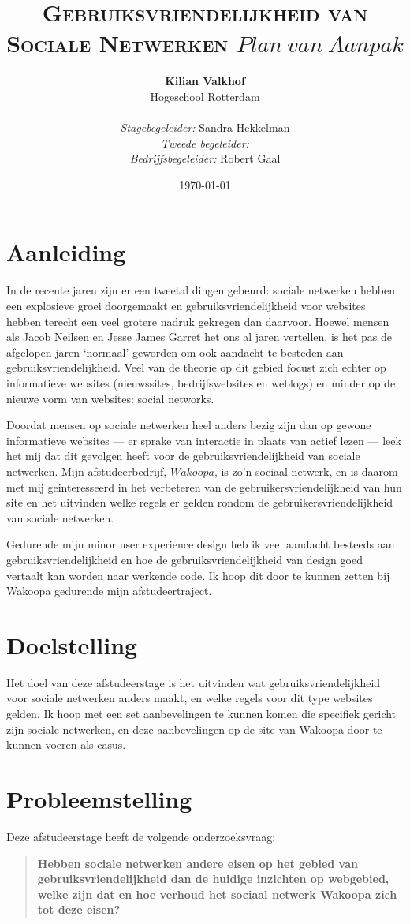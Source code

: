 \documentclass[a4paper, 10pt, pdftex]{article}
\title{\textsc{Gebruiksvriendelijkheid van Sociale Netwerken} \linebreak $Plan~van~Aanpak$}
\author{\textbf{Kilian Valkhof}\\
  Hogeschool Rotterdam\\
  \\
  \textit{Stagebegeleider:} Sandra Hekkelman\\
  \textit{Tweede begeleider:}\\
  \textit{Bedrijfsbegeleider:} Robert Gaal}
\date{\today}
\begin{document}
  \normalem
  \maketitle

  \newpage
  \tableofcontents

  \newpage
\section{Aanleiding}
In de recente jaren zijn er een tweetal dingen gebeurd: sociale netwerken hebben een explosieve groei doorgemaakt
en gebruiksvriendelijkheid voor websites hebben terecht een veel grotere nadruk gekregen dan daarvoor. Hoewel mensen
als Jacob Neilsen en Jesse James Garret het ons al jaren vertellen, is het pas de afgelopen jaren `normaal' geworden
om ook aandacht te besteden aan gebruiksvriendelijkheid. Veel van de theorie op dit gebied focust zich echter op
informatieve websites (nieuwssites, bedrijfswebsites en weblogs) en minder op de nieuwe vorm van websites: social networks.

Doordat mensen op sociale netwerken heel anders bezig zijn dan op gewone informatieve websites --- er sprake van interactie in plaats van actief lezen ---
leek het mij dat dit gevolgen heeft voor de gebruiksvriendelijkheid
van sociale netwerken. Mijn afstudeerbedrijf, $Wakoopa$, is zo'n sociaal netwerk, en is daarom met mij geinteresseerd in het verbeteren
van de gebruikersvriendelijkheid van hun site en het uitvinden welke regels er gelden rondom de gebruikersvriendelijkheid van sociale netwerken.

Gedurende mijn minor user experience design heb ik veel aandacht besteeds aan gebruiksvriendelijkheid en hoe de gebruiksvriendelijkheid van design
goed vertaalt kan worden naar werkende code. Ik hoop dit door te kunnen zetten bij Wakoopa gedurende mijn afstudeertraject.

\section{Doelstelling}
Het doel van deze afstudeerstage is het uitvinden wat gebruiksvriendelijkheid voor sociale netwerken anders maakt, en welke regels voor dit type websites gelden.
Ik hoop met een set aanbevelingen te kunnen komen die specifiek gericht zijn sociale netwerken, en deze aanbevelingen op de site van Wakoopa door te kunnen voeren als casus.


\section{Probleemstelling}
Deze afstudeerstage heeft de volgende onderzoeksvraag:
\begin{quotation}
 \textbf{Hebben sociale netwerken andere eisen op het gebied van gebruiksvriendelijkheid dan de huidige inzichten op webgebied, welke zijn dat en hoe verhoud het sociaal netwerk Wakoopa zich tot deze eisen?}
\end{quotation}
\end{document}
